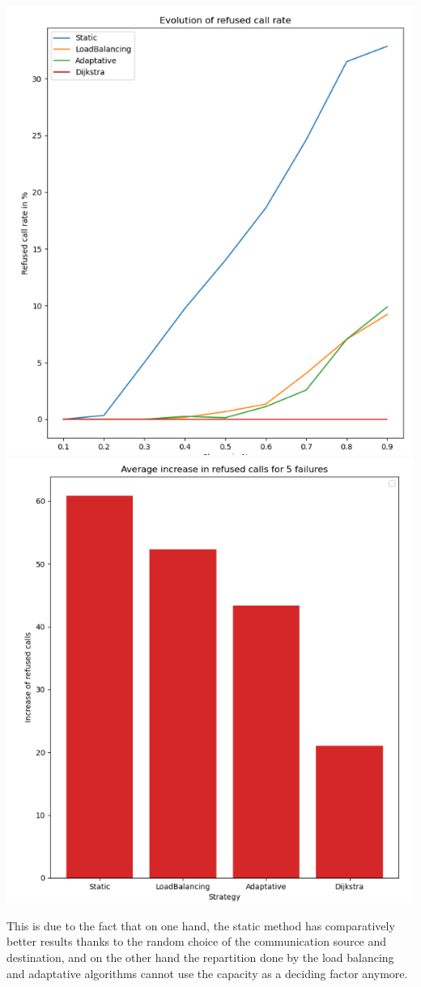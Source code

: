 \documentclass[lettersize,journal]{IEEEtran} %
\begin{document}
\begin{itemize}
\begin{itemize}
\begin{center}
                        \includegraphics[scale=0.30]{same_capacities_1.png}
                        \includegraphics[scale=0.30]{same_capacities_2.png}
                \end{center}
                This is due to the fact that on one hand, the static method has comparatively better results thanks to the random choice of the
                communication source and destination, and on the other hand the repartition done by the load balancing and adaptative algorithms
                cannot use the capacity as a deciding factor anymore.
        \end{itemize}
\end{itemize}
\end{document}
